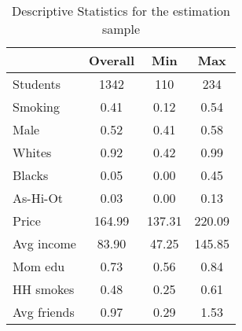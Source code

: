 
\begin{table}[t]
\label{table:descriptive_stats}
\begin{center}
\caption{Descriptive Statistics for the estimation sample}
\begin{tabular}{lccc}
\hline \hline
              & Overall & Min      & Max   \\ \hline
Students    &         1342 &           110 &          234 \\ 
Smoking       &         0.41 &          0.12 &         0.54 \\ 
Male          &         0.52 &          0.41 &         0.58 \\ 
Whites        &         0.92 &          0.42 &         0.99 \\ 
Blacks        &         0.05 &          0.00 &         0.45 \\ 
As-Hi-Ot      &         0.03 &          0.00 &         0.13 \\ 
Price         &       164.99 &        137.31 &       220.09 \\ 
Avg income    &        83.90 &         47.25 &       145.85 \\ 
Mom edu       &         0.73 &          0.56 &         0.84 \\ 
HH smokes     &         0.48 &          0.25 &         0.61 \\ 
Avg friends   &         0.97 &          0.29 &         1.53 \\ 

\hline
\end{tabular}
\label{table:descriptive_stats}
\end{center}
 
\end{table}
